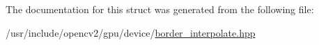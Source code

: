 The documentation for this struct was generated from the following file\-:\begin{DoxyCompactItemize}
\item 
/usr/include/opencv2/gpu/device/\hyperlink{border__interpolate_8hpp}{border\-\_\-interpolate.\-hpp}\end{DoxyCompactItemize}
